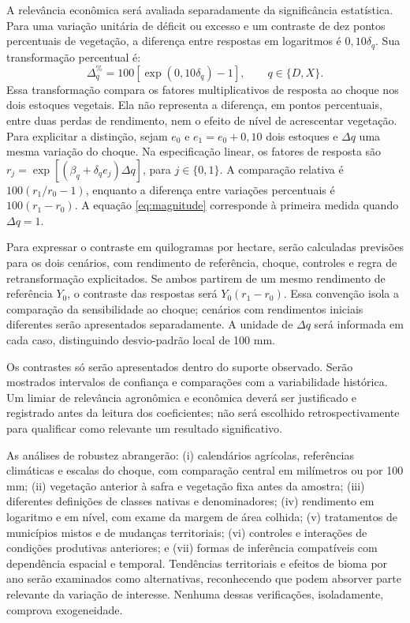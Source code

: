 A relevância econômica será avaliada separadamente da significância estatística. Para uma variação unitária de déficit ou excesso e um contraste de dez pontos percentuais de vegetação, a diferença entre respostas em logaritmos é $0{,}10\delta_q$. Sua transformação percentual é:
\begin{equation}
\Delta_q^{\%}=100\left[\exp(0{,}10\delta_q)-1\right],
\qquad q\in\{D,X\}.
\label{eq:magnitude}
\end{equation}
Essa transformação compara os fatores multiplicativos de resposta ao choque nos dois estoques vegetais. Ela não representa a diferença, em pontos percentuais, entre duas perdas de rendimento, nem o efeito de nível de acrescentar vegetação. Para explicitar a distinção, sejam $e_0$ e $e_1=e_0+0{,}10$ dois estoques e $\Delta q$ uma mesma variação do choque. Na especificação linear, os fatores de resposta são $r_j=\exp[(\beta_q+\delta_q e_j)\Delta q]$, para $j\in\{0,1\}$. A comparação relativa é $100(r_1/r_0-1)$, enquanto a diferença entre variações percentuais é $100(r_1-r_0)$. A equação \ref{eq:magnitude} corresponde à primeira medida quando $\Delta q=1$.

Para expressar o contraste em quilogramas por hectare, serão calculadas previsões para os dois cenários, com rendimento de referência, choque, controles e regra de retransformação explicitados. Se ambos partirem de um mesmo rendimento de referência $Y_0$, o contraste das respostas será $Y_0(r_1-r_0)$. Essa convenção isola a comparação da sensibilidade ao choque; cenários com rendimentos iniciais diferentes serão apresentados separadamente. A unidade de $\Delta q$ será informada em cada caso, distinguindo desvio-padrão local de 100 mm.

Os contrastes só serão apresentados dentro do suporte observado. Serão mostrados intervalos de confiança e comparações com a variabilidade histórica. Um limiar de relevância agronômica e econômica deverá ser justificado e registrado antes da leitura dos coeficientes; não será escolhido retrospectivamente para qualificar como relevante um resultado significativo.

As análises de robustez abrangerão: (i) calendários agrícolas, referências climáticas e escalas do choque, com comparação central em milímetros ou por 100 mm; (ii) vegetação anterior à safra e vegetação fixa antes da amostra; (iii) diferentes definições de classes nativas e denominadores; (iv) rendimento em logaritmo e em nível, com exame da margem de área colhida; (v) tratamentos de municípios mistos e de mudanças territoriais; (vi) controles e interações de condições produtivas anteriores; e (vii) formas de inferência compatíveis com dependência espacial e temporal. Tendências territoriais e efeitos de bioma por ano serão examinados como alternativas, reconhecendo que podem absorver parte relevante da variação de interesse. Nenhuma dessas verificações, isoladamente, comprova exogeneidade.

